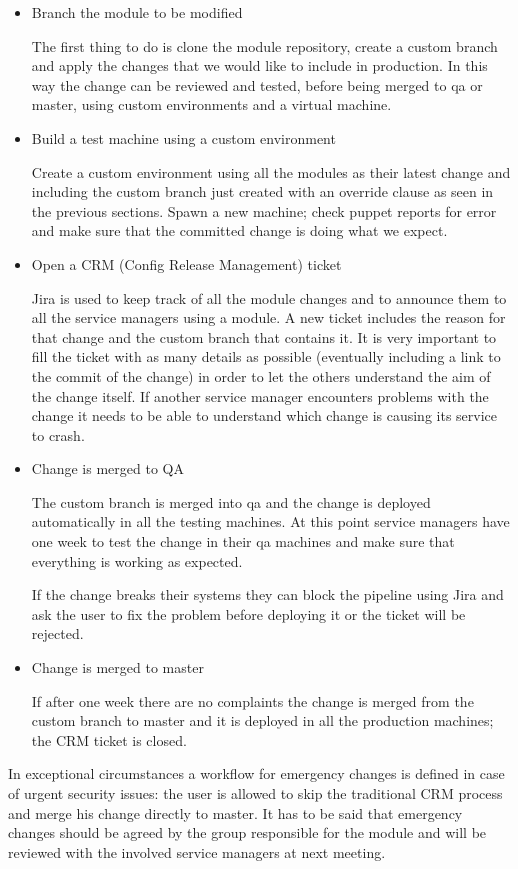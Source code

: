 \begin{itemize}

\item Branch the module to be modified

The first thing to do is clone the module repository, create a custom
branch and apply the changes that we would like to include in production.
In this way the change can be reviewed and tested, before being merged to
qa or master, using custom environments and a virtual machine.

\item Build a test machine using a custom environment

Create a custom environment using all the modules as their latest change
and including the custom branch just created with an override clause as
seen in the previous sections. Spawn a new machine; check puppet reports
for error and make sure that the committed change is doing what we expect.

\item Open a CRM (Config Release Management) ticket

Jira \cite{JiraWebsite} is used to keep track of all the module changes and to
announce them to all the service managers using a module. A new ticket includes
the reason for that change and the custom branch that contains it. It is very
important to fill the ticket with as many details as possible (eventually
including a link to the commit of the change) in order to let the others
understand the aim of the change itself. If another service manager encounters
problems with the change it needs to be able to understand which change is
causing its service to crash.

\item Change is merged to QA

The custom branch is merged into qa and the change is deployed automatically in
all the testing machines. At this point service managers have one week to test
the change in their qa machines and make sure that everything is working as
expected.

If the change breaks their systems they can block the pipeline using Jira
and ask the user to fix the problem before deploying it or the ticket will
be rejected.

\item Change is merged to master

If after one week there are no complaints the change is merged from the
custom branch to master and it is deployed in all the production machines;
the CRM ticket is closed.

\end{itemize}

In exceptional circumstances a workflow for emergency changes is defined in
case of urgent security issues: the user is allowed to skip the traditional CRM
process and merge his change directly to master. It has to be said that
emergency changes should be agreed by the group responsible for the module and
will be reviewed with the involved service managers at next meeting.

